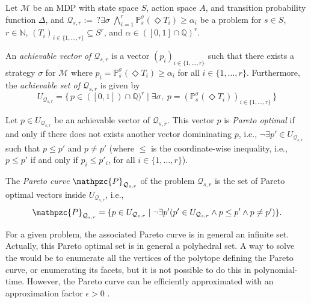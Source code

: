 Let $\mathcal{M}$ be an MDP with state space $S$, action space $A$, and transition probability function $\Delta$, and
$
  \mathcal{Q}_{s, r} := \,?\exists \sigma\; \bigwedge_{i=1}^r \mathbb{P}^\sigma_s(\Diamond T_i) \geq \alpha_i
$
be a \MOSR{} problem for $s \in S$, $r \in \mathbb{N}$, $(T_i)_{i \in \{1, \dots, r\}} \subseteq S^r$, and $\alpha \in ([0, 1] \cap \mathbb{Q})^r$.

\begin{definition}
An \textit{achievable vector of $\mathcal{Q}_{s, r}$} is a vector $(p_i)_{i \in \{1, \dots, r\}}$ such that there exists a strategy $\sigma$ for $\mathcal{M}$ where $p_i = \mathbb{P}^\sigma_s(\Diamond T_i) \geq \alpha_i$ for all $i \in \{1, \dots, r\}$.
Furthermore, the \textit{achievable set of $\mathcal{Q}_{s, r}$} is given by
\[U_{\mathcal{Q}_{s, r}} = \{ \, p \in ([0, 1]) \cap \mathbb{Q})^r \; | \; \exists \sigma, \; p = (\mathbb{P}_s^\sigma (\Diamond T_i))_{i \in \{1, \dots, r\}} \, \}\]
\end{definition}

\begin{definition}
  Let $p \in U_{\mathcal{Q}_{s, r}}$ be an achievable vector of $\mathcal{Q}_{s, r}$.
  This vector $p$ is \textit{Pareto optimal} if and only if there does not exists another vector domininating $p$, i.e., $\neg \exists p' \in U_{\mathcal{Q}_{s, r}}$ such that $p \leq p'$ and $p \neq p'$
  (where $\leq$ is the coordinate-wise inequality, i.e., $p\leq p'$ if and only if $p_i \leq p'_i$, for all $i \in \{1, \dots, r\}$).
\end{definition}

\begin{definition}
  The \textit{Pareto curve} $\mathpzc{P}_{\mathcal{Q}_{s, r}}$
  of the \MOSR{} problem $\mathcal{Q}_{s, r}$ is the set of Pareto optimal vectors inside $U_{\mathcal{Q}_{s, r}}$, i.e.,
  \[
    \mathpzc{P}_{\mathcal{Q}_{s, r}} =
    \{ p \in U_{\mathcal{Q}_{s, r}} \; | \;
    \neg \exists p'(p' \in U_{\mathcal{Q}_{s, r}} \wedge p \leq p' \wedge p \neq p')\}.
  \]
\end{definition}
For a given \MOSR{} problem, the associated Pareto curve is in general an infinite set.
Actually, this Pareto optimal set is in general a polyhedral set. %
A way to solve the \MOSR{} would be to enumerate all the vertices of the polytope defining the Pareto curve, or enumerating its facets, but it is not possible to do this in polynomial-time.
However, the Pareto curve can be efficiently approximated with an approximation factor $\epsilon > 0$ \cite{DBLP:conf/focs/PapadimitriouY00}.

